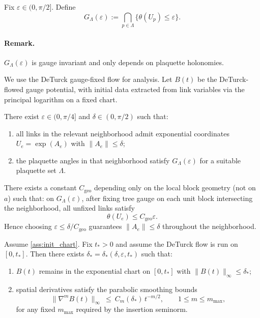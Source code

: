 \begin{definition}\label{def:good_plaq}
Fix $\varepsilon\in(0,\pi/2]$. Define
\[
G_{\Lambda}(\varepsilon):=\bigcap_{p\in \Lambda}\{\theta(U_p)\le \varepsilon\}.
\]
\end{definition}

\paragraph{Remark.}
$G_{\Lambda}(\varepsilon)$ is gauge invariant and only depends on plaquette holonomies.

We use the DeTurck gauge-fixed flow for analysis. Let $B(t)$ be the DeTurck-flowed gauge potential,
with initial data extracted from link variables via the principal logarithm on a fixed chart.

\begin{proposition}\label{ass:init_chart}
There exist $\varepsilon\in(0,\pi/4]$ and $\delta\in(0,\pi/2)$ such that:
\begin{enumerate}[label=(IC\arabic*)]
\item all links in the relevant neighborhood admit exponential coordinates $U_e=\exp(A_e)$ with $\|A_e\|\le \delta$;
\item the plaquette angles in that neighborhood satisfy $G_{\Lambda}(\varepsilon)$ for a suitable plaquette set $\Lambda$.
\end{enumerate}
\end{proposition}

\begin{lemma}\label{lem:tree_chart_local}
There exists a constant $C_{\mathrm{geo}}$ depending only on the local block geometry (not on $a$) such that:
on $G_{\Lambda}(\varepsilon)$, after fixing tree gauge on each unit block intersecting the neighborhood, all unfixed links satisfy
\[
\theta(U_e)\le C_{\mathrm{geo}}\varepsilon.
\]
Hence choosing $\varepsilon\le \delta/C_{\mathrm{geo}}$ guarantees $\|A_e\|\le \delta$ throughout the neighborhood.
\end{lemma}

\begin{lemma}\label{lem:chart_persist}
Assume \ref{ass:init_chart}. Fix $t_\ast>0$ and assume the DeTurck flow is run on $[0,t_\ast]$.
Then there exists $\delta_\ast=\delta_\ast(\delta,\varepsilon,t_\ast)$ such that:
\begin{enumerate}[label=(P\arabic*)]
\item $B(t)$ remains in the exponential chart on $[0,t_\ast]$ with $\|B(t)\|_\infty\le \delta_\ast$;
\item spatial derivatives satisfy the parabolic smoothing bounds
\[
\|\nabla^m B(t)\|_\infty\ \le\ C_m(\delta_\ast)\,t^{-m/2},\qquad 1\le m\le m_{\max},
\]
for any fixed $m_{\max}$ required by the insertion seminorm.
\end{enumerate}
\end{lemma}

